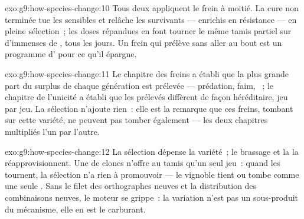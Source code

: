 \begin{solution}{exo:g9:how-species-change:10}
Tous deux appliquent le frein à moitié. La cure non terminée
tue les sensibles et relâche les survivants --- enrichis en
résistance --- en pleine sélection~; les doses répandues en
 font tourner le même tamis partiel sur d'immenses
 de , tous les jours. Un frein qui
prélève sans aller au bout est un programme d' pour
ce qu'il épargne.
\end{solution}

\begin{solution}{exo:g9:how-species-change:11}
Le chapitre des freins a établi que la plus grande part du
surplus de chaque génération est prélevée --- prédation,
faim, ~; le chapitre de l'unicité a établi que les
prélevés diffèrent de façon héréditaire, jeu par jeu. La
sélection n'ajoute rien~: elle est la remarque que ces
freins, tombant sur cette variété, ne peuvent pas tomber
également --- les deux chapitres multipliés l'un par l'autre.
\end{solution}

\begin{solution}{exo:g9:how-species-change:12}
La sélection dépense la variété~; le brassage et la 
la réapprovisionnent. Une  de clones n'offre au
tamis qu'un seul jeu~: quand les  tournent, la
sélection n'a rien à promouvoir --- le vignoble tient ou
tombe comme une seule . Sans le filet des orthographes
neuves et la distribution des combinaisons neuves, le moteur
se grippe~: la variation n'est pas un sous-produit du
mécanisme, elle en est le carburant.
\end{solution}

